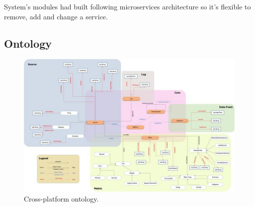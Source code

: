 \documentclass[runningheads,a4paper]{llncs}
\begin{document}
System's modules had built following microservices architecture so it's flexible to remove, add and change a service. 


\subsection{Ontology}

\begin{figure}[H]
\centering
\includegraphics[scale=0.4]{ontology}
\caption{Cross-platform ontology.}
\end{figure}
\end{document}
